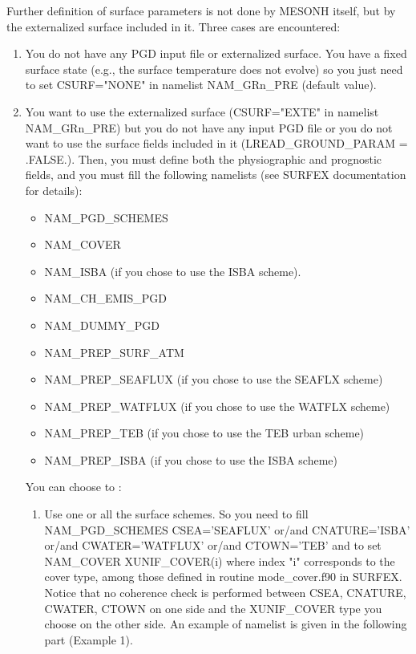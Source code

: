 Further definition of surface parameters is not done by MESONH itself, but by the externalized surface included in it.
Three cases are encountered:
\begin{enumerate}

\item You do not have any PGD input file or externalized surface. You have a fixed surface state (e.g., the surface temperature does not evolve) so you just need to set
CSURF="NONE" in namelist NAM\_GRn\_PRE (default value).
\item You want to use the externalized surface (CSURF="EXTE" in namelist NAM\_GRn\_PRE) but you do not have any input PGD file or you do not want to use the surface fields included in it (LREAD\_GROUND\_PARAM = .FALSE.). Then, you must  define both the physiographic and prognostic fields, and you must fill the following namelists (see SURFEX documentation for details):

\begin{itemize}
\item NAM\_PGD\_SCHEMES
\item NAM\_COVER
\item NAM\_ISBA (if you chose to use the ISBA scheme).
\item NAM\_CH\_EMIS\_PGD
\item NAM\_DUMMY\_PGD
\item NAM\_PREP\_SURF\_ATM
\item NAM\_PREP\_SEAFLUX (if you chose to use the SEAFLX scheme)
\item NAM\_PREP\_WATFLUX (if you chose to use the WATFLX scheme)
\item NAM\_PREP\_TEB (if you chose to use the TEB urban scheme)
\item NAM\_PREP\_ISBA (if you chose to use the ISBA scheme)
\end{itemize}

You can choose to :
\begin{enumerate}
\item Use one or all the surface schemes. So you need to fill NAM\_PGD\_SCHEMES CSEA='SEAFLUX' or/and
CNATURE='ISBA' or/and CWATER='WATFLUX' or/and CTOWN='TEB' and to set
NAM\_COVER XUNIF\_COVER(i) where index "i" corresponds to the cover type, among those defined in
routine mode\_cover.f90 in SURFEX. Notice that no coherence
check is performed between CSEA, CNATURE, CWATER, CTOWN on one side and
the XUNIF\_COVER type you choose on the other side.
An example of namelist is given in the following part (Example 1).


\end{enumerate}
\end{enumerate}
